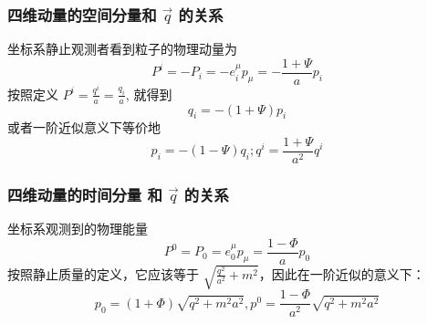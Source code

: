 \documentclass[CJK,13pt]{beamer}
\begin{document}
  \begin{frame}  
  \frametitle{四维动量的空间分量和 $\vec{q}$ 的关系}
    坐标系静止观测者看到粒子的物理动量为
    $$ P^i = - P_i = - e^\mu_i p_\mu = -\frac{1+\Psi}{a} p_i $$
    按照定义 $P^i = \frac{q^i}{a} = \frac{q_i}{a}$, 就得到
    $$ q_i = -(1+\Psi)p_i$$
    或者一阶近似意义下等价地
    $$p_i = -(1-\Psi)q_i; q^i = \frac{1+\Psi}{a^2}q^i$$    
  \end{frame}

  \begin{frame}  
  \frametitle{四维动量的时间分量 和 $\vec{q}$ 的关系}
  坐标系观测到的物理能量
  $$P^0 = P_0 = e_0^\mu p_\mu = \frac{1-\Phi}{a} p_0$$
  按照静止质量的定义，它应该等于 $\sqrt{\frac{q^2}{a^2}+m^2}$，因此在一阶近似的意义下：
  $$p_0 = (1+\Phi)\sqrt{q^2+m^2a^2}, p^0 = \frac{1-\Phi}{a^2}\sqrt{q^2+m^2a^2}$$
  \end{frame}
  \ech
\end{document}
